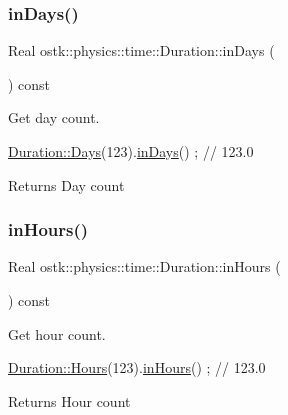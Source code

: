 \subsubsection{\texorpdfstring{in\+Days()}{inDays()}}
{\footnotesize\ttfamily Real ostk\+::physics\+::time\+::\+Duration\+::in\+Days (\begin{DoxyParamCaption}{ }\end{DoxyParamCaption}) const}



Get day count. 


\begin{DoxyCode}
\hyperlink{classostk_1_1physics_1_1time_1_1_duration_aefb4abc87c6957d00650228d069fa1e1}{Duration::Days}(123).\hyperlink{classostk_1_1physics_1_1time_1_1_duration_a2c8f2e97717d02ba4f8dc044fe4f0b1e}{inDays}() ; \textcolor{comment}{// 123.0}
\end{DoxyCode}


\begin{DoxyReturn}{Returns}
Day count 
\end{DoxyReturn}
\mbox{\label{classostk_1_1physics_1_1time_1_1_duration_a24026d219798a960db5482f4cda808c3}} 
\subsubsection{\texorpdfstring{in\+Hours()}{inHours()}}
{\footnotesize\ttfamily Real ostk\+::physics\+::time\+::\+Duration\+::in\+Hours (\begin{DoxyParamCaption}{ }\end{DoxyParamCaption}) const}



Get hour count. 


\begin{DoxyCode}
\hyperlink{classostk_1_1physics_1_1time_1_1_duration_a950723133d46c93a06907543d15e4dc0}{Duration::Hours}(123).\hyperlink{classostk_1_1physics_1_1time_1_1_duration_a24026d219798a960db5482f4cda808c3}{inHours}() ; \textcolor{comment}{// 123.0}
\end{DoxyCode}


\begin{DoxyReturn}{Returns}
Hour count 
\end{DoxyReturn}
\mbox{\label{classostk_1_1physics_1_1time_1_1_duration_a67a7723ff079f5a4404a5fa1b0fd2128}} 
